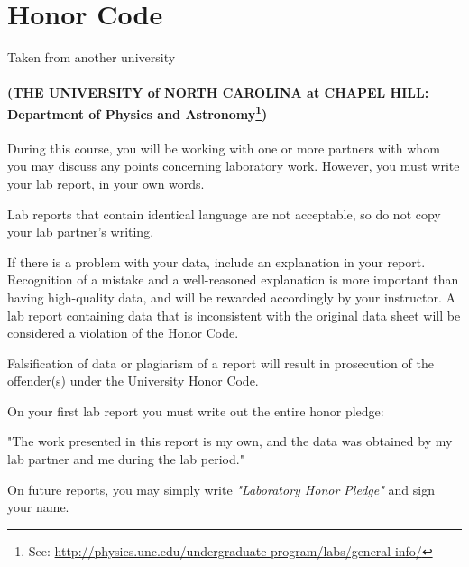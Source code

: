 \documentclass[10pt, english, notes]{beamer}
\begin{document}
\section{Honor Code}
\begin{frame}{Taken from another university}
\framesubtitle{(THE UNIVERSITY of NORTH CAROLINA at CHAPEL HILL: Department of Physics and Astronomy\footnote{See: \url{http://physics.unc.edu/undergraduate-program/labs/general-info/}})}
During this course, you will be working with one or more partners with whom you may discuss any points concerning laboratory work. However, you must write your lab report, in your own words. 
\par
Lab reports that contain identical language are not acceptable, so do not copy your lab partner's writing.
\par
If there is a problem with your data, include an explanation in your report. Recognition of a mistake and a well-reasoned explanation is more important than having high-quality data, and will be rewarded accordingly by your instructor. A lab report containing data that is inconsistent with the original data sheet will be considered a violation of the Honor Code.
\end{frame}
\begin{frame}
Falsification of data or plagiarism of a report will result in prosecution of the offender(s) under the University Honor Code.
\par
On your first lab report you must write out the entire honor pledge:
\par
{}
\begin{alertblock}{}
\centering
"The work presented in this report is my own, and the data was obtained by my lab partner and me during the lab period."
\end{alertblock}
\par
On future reports, you may simply write \emph{"Laboratory Honor Pledge"} and sign your name.
\end{frame}
\end{document}
